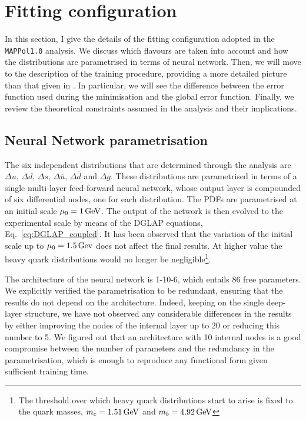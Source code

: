 \section{Fitting configuration}
\label{sec:4.3}
In this section, I give the details of the fitting configuration adopted in the \texttt{MAPPol1.0} analysis. We discuss which flavours are taken into account and how the distributions are parametrised in terms of neural network. Then, we will move to the description of the training procedure, providing a more detailed picture than that given in . In particular, we will see the difference between the error function used during the minimisation and the global error function. Finally, we review the theoretical constraints assumed in the analysis and their implications.

\subsection*{Neural Network parametrisation}
The six independent distributions that are determined through the analysis are $\Delta u, \, \Delta d, \, \Delta s, \, \Delta \bar{u}, \, \Delta \bar{d}$ and $\Delta g$. These distributions are parametrised in terms of a single multi-layer feed-forward neural network, whose output layer is compounded of six differential nodes, one for each distribution. The PDFs are parametrised at an initial scale $\mu_0 = 1 \, \textrm{GeV}$. The output of the network is then evolved to the experimental scale by means of the DGLAP equations, Eq.~\eqref{eq:DGLAP_coupled}. It has been observed that the variation of the initial scale up to $\mu_0 = 1.5 \, \textrm{Gev}$ does not affect the final results. At higher value the heavy quark distributions would no longer be negligible\footnote{\footnotesize{The threshold over which heavy quark distributions start to arise is fixed to the quark masses, $m_c=1.51\, \textrm{GeV}$ and $m_b=4.92\, \textrm{GeV}$}}.%

The architecture of the neural network is 1-10-6, which entails 86 free parameters. We explicitly verified the parametrisation to be redundant, ensuring that the results do not depend on the architecture. Indeed, keeping on the single deep-layer structure, we have not observed any considerable differences in the results by either improving the nodes of the internal layer up to 20 or reducing this number to 5. We figured out that an architecture with 10 internal nodes is a good compromise between the number of parameters and the redundancy in the parametrisation, which is enough to reproduce any functional form given sufficient training time.%

